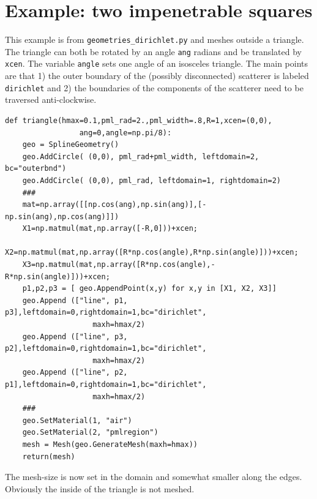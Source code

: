 \documentclass[12pt]{article}
\begin{document}
\section{Example: two impenetrable squares}
This example is from \verb+geometries_dirichlet.py+ and meshes outside a triangle. The triangle can both be rotated by an angle \verb+ang+ radians and be translated by \verb+xcen+.  The variable \verb+angle+ sets one angle of an isosceles triangle.  The main points are that 1) the outer boundary of the (possibly disconnected) scatterer is labeled \verb+dirichlet+ and 2) the boundaries of the
components of the scatterer need to be traversed anti-clockwise.  
\begin{verbatim}
def triangle(hmax=0.1,pml_rad=2.,pml_width=.8,R=1,xcen=(0,0),
                 ang=0,angle=np.pi/8):
    geo = SplineGeometry()
    geo.AddCircle( (0,0), pml_rad+pml_width, leftdomain=2, bc="outerbnd")
    geo.AddCircle( (0,0), pml_rad, leftdomain=1, rightdomain=2)
    ###
    mat=np.array([[np.cos(ang),np.sin(ang)],[-np.sin(ang),np.cos(ang)]])
    X1=np.matmul(mat,np.array([-R,0]))+xcen;
    X2=np.matmul(mat,np.array([R*np.cos(angle),R*np.sin(angle)]))+xcen;
    X3=np.matmul(mat,np.array([R*np.cos(angle),-R*np.sin(angle)]))+xcen;
    p1,p2,p3 = [ geo.AppendPoint(x,y) for x,y in [X1, X2, X3]]
    geo.Append (["line", p1, p3],leftdomain=0,rightdomain=1,bc="dirichlet",
                    maxh=hmax/2)
    geo.Append (["line", p3, p2],leftdomain=0,rightdomain=1,bc="dirichlet",
                    maxh=hmax/2)
    geo.Append (["line", p2, p1],leftdomain=0,rightdomain=1,bc="dirichlet",
                    maxh=hmax/2)
    ###
    geo.SetMaterial(1, "air")
    geo.SetMaterial(2, "pmlregion")
    mesh = Mesh(geo.GenerateMesh(maxh=hmax))
    return(mesh)    
   \end{verbatim}
   The mesh-size is now set in the domain and somewhat smaller along the edges. Obviously the inside of the triangle is not meshed.
\end{document}
